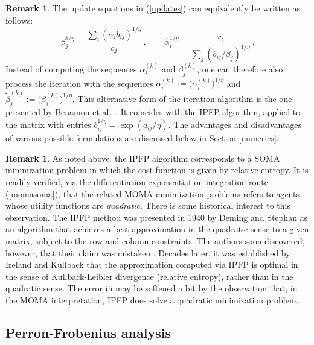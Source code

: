 \documentclass{article}
\theoremstyle{definition}
\newtheorem{remark}[theorem]{Remark}
\begin{document}
\begin{remark}
The update equations in (\ref{updates}) can equivalently be written as follows:
\begin{equation} \label{benamou}
\beta_j^{1/\eta} = \frac{\sum_i (\alpha_i b_{ij})^{1/\eta}}{c_j}\,, \qquad
\hat{\alpha}_i^{1/\eta} = \frac{r_i}{\sum_j (b_{ij}/\beta_j)^{1/\eta}}\,.
\end{equation}
Instead of computing the sequences $\alpha_i^{(k)}$ and $\beta_j^{(k)}$, one can therefore also process the iteration with the sequences $\tilde{\alpha}_i^{(k)}:=\big(\alpha_i^{(k)}\big)^{1/\eta}$ and $\tilde{\beta}_j^{(k)}:=\big(\beta_j^{(k)}\big)^{1/\eta}$. This alternative form of the iteration algorithm is the one presented by Benamou et al.\ \cite{Benamou}. It coincides with the IPFP algorithm, applied to the matrix with entries $b_{ij}^{1/\eta}= \exp(a_{ij}/\eta)$. The advantages and disadvantages of various possible formulations are discussed below in Section \ref{numerics}.
\end{remark}

\begin{remark} \label{deming}
As noted above, the IPFP algorithm corresponds to a SOMA minimization problem in which the cost function is given by
relative entropy. It is readily verified, via the differentiation-exponentiation-integration route (\ref{momasoma}), that
the related MOMA minimization problems refers to agents whose utility functions are \emph{quadratic}. There is some historical
interest to this observation. The IPFP method was presented in 1940 by Deming and Stephan \cite{Deming} as an algorithm that achieves a best approximation in the quadratic sense to a given matrix, subject to the row and column constraints. The authors soon discovered, however,
that their claim was mistaken \cite{Stephan}. Decades later, it was established by Ireland and Kullback \cite{Ireland} that the approximation computed via IPFP is optimal in the sense of Kullback-Leibler divergence (relative entropy), rather than in the quadratic sense. The error in \cite{Deming} may be softened a bit by the observation that, in the MOMA interpretation, IPFP does solve a quadratic minimization problem.
\end{remark}

\subsection{Perron-Frobenius analysis}
\end{document}
